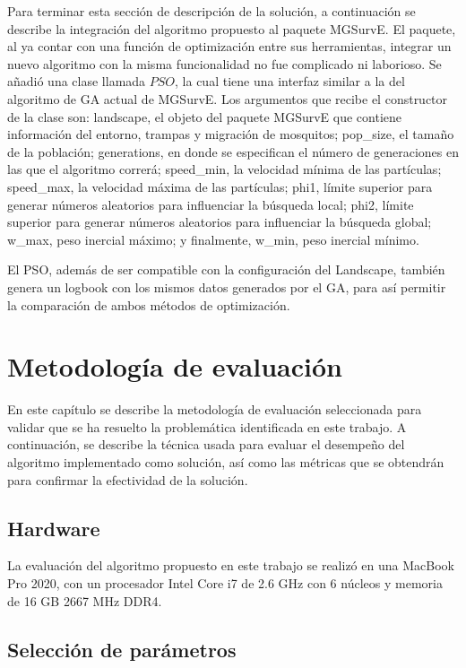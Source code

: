 \documentclass[letterpaper]{report}
\begin{document}
    Para terminar esta sección de descripción de la solución, a continuación se
    describe la integración del algoritmo propuesto al paquete MGSurvE. El
    paquete, al ya contar con una función de optimización entre sus
    herramientas, integrar un nuevo algoritmo con la misma funcionalidad no fue
    complicado ni laborioso. Se añadió una clase llamada $PSO$, la cual tiene
    una interfaz similar a la del algoritmo de GA actual de MGSurvE. Los
    argumentos que recibe el constructor de la clase son: landscape, el objeto
    del paquete MGSurvE que contiene información del entorno, trampas y
    migración de mosquitos; pop\_size, el tamaño de la población; generations,
    en donde se especifican el número de generaciones en las que el algoritmo
    correrá; speed\_min, la velocidad mínima de las partículas; speed\_max, la
    velocidad máxima de las partículas; phi1, límite superior para generar
    números aleatorios para influenciar la búsqueda local; phi2, límite superior
    para generar números aleatorios para influenciar la búsqueda global; w\_max,
    peso inercial máximo; y finalmente, w\_min, peso inercial mínimo.
    
    El PSO, además de ser compatible con la configuración del Landscape, también
    genera un logbook con los mismos datos generados por el GA, para así
    permitir la comparación de ambos métodos de optimización. 


\chapter{Metodología de evaluación}

  En este capítulo se describe la metodología de evaluación seleccionada para
  validar que se ha resuelto la problemática identificada en este trabajo. A
  continuación, se describe la técnica usada para evaluar el desempeño del
  algoritmo implementado como solución, así como las métricas que se obtendrán
  para confirmar la efectividad de la solución.

  \section{Hardware}

    La evaluación del algoritmo propuesto en este trabajo se realizó en una
    MacBook Pro 2020, con un procesador Intel Core i7 de 2.6 GHz con 6 núcleos y
    memoria de 16 GB 2667 MHz DDR4.

  \section{Selección de parámetros}
\end{document}

